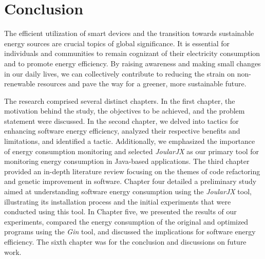 \vspace{-10pt}
\section{Conclusion}

The efficient utilization of smart devices and the transition towards sustainable energy sources are crucial topics of global significance. It is essential for individuals and communities to remain cognizant of their electricity consumption and to promote energy efficiency. By raising awareness and making small changes in our daily lives, we can collectively contribute to reducing the strain on non-renewable resources and pave the way for a greener, more sustainable future.

\vspace{.5em}
The research comprised several distinct chapters. In the first chapter, the motivation behind the study, the objectives to be achieved, and the problem statement were discussed. In the second chapter, we delved into tactics for enhancing software energy efficiency, analyzed their respective benefits and limitations, and identified a tactic. Additionally, we emphasized the importance of energy consumption monitoring and selected \textit{JoularJX} as our primary tool for monitoring energy consumption in Java-based applications. The third chapter provided an in-depth literature review focusing on the themes of code refactoring and genetic improvement in software. Chapter four detailed a preliminary study aimed at understanding software energy consumption using the \textit{JoularJX} tool, illustrating its installation process and the initial experiments that were conducted using this tool. In Chapter five, we presented the results of our experiments, compared the energy consumption of the original and optimized programs using the \textit{Gin} tool, and discussed the implications for software energy efficiency. The sixth chapter was for the conclusion and discussions on future work.

